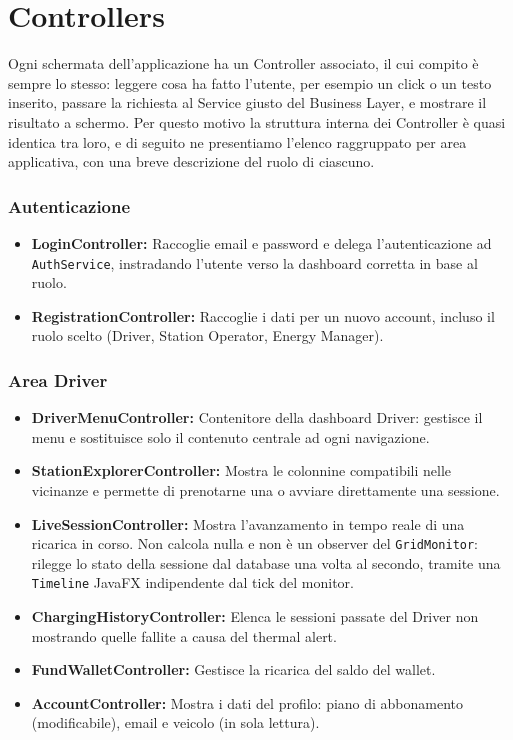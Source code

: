 \section{Controllers}

Ogni schermata dell'applicazione ha un Controller associato, il cui compito è sempre lo stesso: leggere cosa ha fatto l'utente, per esempio un click o un testo inserito, passare la richiesta al Service giusto del Business Layer, e mostrare il risultato a schermo. Per questo motivo la struttura interna dei Controller è quasi identica tra loro, e di seguito ne presentiamo l'elenco raggruppato per area applicativa, con una breve descrizione del ruolo di ciascuno.

\subsubsection{Autenticazione}

\begin{itemize}
    \item \textbf{LoginController:} Raccoglie email e password e delega l'autenticazione ad \texttt{AuthService}, instradando l'utente verso la dashboard corretta in base al ruolo.
    \item \textbf{RegistrationController:} Raccoglie i dati per un nuovo account, incluso il ruolo scelto (Driver, Station Operator, Energy Manager).
\end{itemize}

\subsubsection{Area Driver}

\begin{itemize}
    \item \textbf{DriverMenuController:} Contenitore della dashboard Driver: gestisce il menu e sostituisce solo il contenuto centrale ad ogni navigazione.
    \item \textbf{StationExplorerController:} Mostra le colonnine compatibili nelle vicinanze e permette di prenotarne una o avviare direttamente una sessione.
    \item \textbf{LiveSessionController:} Mostra l'avanzamento in tempo reale di una ricarica in corso. Non calcola nulla e non è un observer del \texttt{GridMonitor}: rilegge lo stato della sessione dal database una volta al secondo, tramite una \texttt{Timeline} JavaFX indipendente dal tick del monitor.
    \item \textbf{ChargingHistoryController:} Elenca le sessioni passate del Driver non mostrando quelle fallite a causa del thermal alert.
    \item \textbf{FundWalletController:} Gestisce la ricarica del saldo del wallet.
    \item \textbf{AccountController:} Mostra i dati del profilo: piano di abbonamento (modificabile), email e veicolo (in sola lettura).
\end{itemize}

